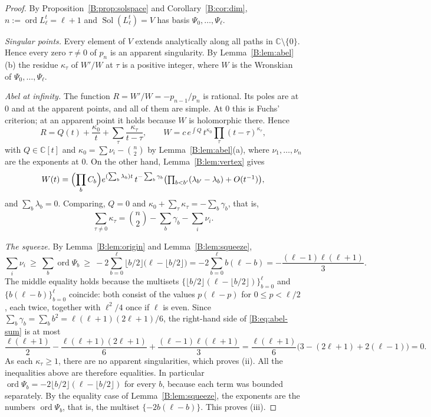 \documentclass[11pt,a4paper]{article}
\theoremstyle{definition}
\theoremstyle{remark}
\newcommand{\C}{\mathbb C}
\newcommand{\fl}[1]{\lfloor #1\rfloor}
\DeclareMathOperator{\ord}{ord}
\DeclareMathOperator{\Sol}{Sol}
\numberwithin{equation}{section}
\begin{document}
\begin{proof}
By Proposition~\ref{B:prop:solspace} and Corollary~\ref{B:cor:dim}, $n:=\ord L^t_\ell=\ell+1$ and $\Sol(L^t_\ell)=V$ has basis $\Psi_0,\dots,\Psi_\ell$.

\emph{Singular points.} Every element of $V$ extends analytically along all paths in $\C\setminus\{0\}$. Hence every zero $\tau\ne0$ of $p_n$ is an apparent singularity. By Lemma~\ref{B:lem:abel}(b) the residue $\kappa_\tau$ of $W'/W$ at $\tau$ is a positive integer, where $W$ is the Wronskian of $\Psi_0,\dots,\Psi_\ell$.

\emph{Abel at infinity.} The function $R=W'/W=-p_{n-1}/p_n$ is rational. Its poles are at $0$ and at the apparent points, and all of them are simple. At $0$ this is Fuchs' criterion; at an apparent point it holds because $W$ is holomorphic there. Hence
\[
R=Q(t)+\frac{\kappa_0}{t}+\sum_{\tau}\frac{\kappa_\tau}{t-\tau},\qquad W=c\,e^{\int Q}\,t^{\kappa_0}\prod_\tau(t-\tau)^{\kappa_\tau},
\]
with $Q\in\C[t]$ and $\kappa_0=\sum\nu_i-\binom n2$ by Lemma~\ref{B:lem:abel}(a), where $\nu_1,\dots,\nu_n$ are the exponents at $0$. On the other hand, Lemma~\ref{B:lem:vertex} gives
\[
W(t)=\Bigl(\prod_bC_b\Bigr)e^{(\sum_b\lambda_b)t}\,t^{-\sum_b\gamma_b}\bigl(\textstyle\prod_{b<b'}(\lambda_{b'}-\lambda_b)+O(t^{-1})\bigr),
\]
and $\sum_b\lambda_b=0$. Comparing, $Q=0$ and $\kappa_0+\sum_\tau\kappa_\tau=-\sum_b\gamma_b$, that is,
\begin{equation}\label{B:eq:abel-sum}
\sum_{\tau\ne0}\kappa_\tau=\binom{n}{2}-\sum_b\gamma_b-\sum_i\nu_i .
\end{equation}

\emph{The squeeze.} By Lemma~\ref{B:lem:origin} and Lemma~\ref{B:lem:squeeze},
\[
\sum_i\nu_i\ \ge\ \sum_b\ord\Psi_b\ \ge\ -2\sum_{b=0}^{\ell}\fl{b/2}\bigl(\ell-\fl{b/2}\bigr)=-2\sum_{b=0}^{\ell}b(\ell-b)=-\frac{(\ell-1)\ell(\ell+1)}{3}.
\]
The middle equality holds because the multisets $\{\fl{b/2}(\ell-\fl{b/2})\}_{b=0}^{\ell}$ and $\{b(\ell-b)\}_{b=0}^{\ell}$ coincide: both consist of the values $p(\ell-p)$ for $0\le p<\ell/2$, each twice, together with $\ell^2/4$ once if $\ell$ is even. Since $\sum_b\gamma_b=\sum_bb^2=\ell(\ell+1)(2\ell+1)/6$, the right-hand side of \eqref{B:eq:abel-sum} is at most
\[
\frac{\ell(\ell+1)}2-\frac{\ell(\ell+1)(2\ell+1)}6+\frac{(\ell-1)\ell(\ell+1)}3=\frac{\ell(\ell+1)}6\bigl(3-(2\ell+1)+2(\ell-1)\bigr)=0 .
\]
As each $\kappa_\tau\ge1$, there are no apparent singularities, which proves (ii). All the inequalities above are therefore equalities. In particular $\ord\Psi_b=-2\fl{b/2}(\ell-\fl{b/2})$ for every $b$, because each term was bounded separately. By the equality case of Lemma~\ref{B:lem:squeeze}, the exponents are the numbers $\ord\Psi_b$, that is, the multiset $\{-2b(\ell-b)\}$. This proves (iii).


\end{proof}
\end{document}
